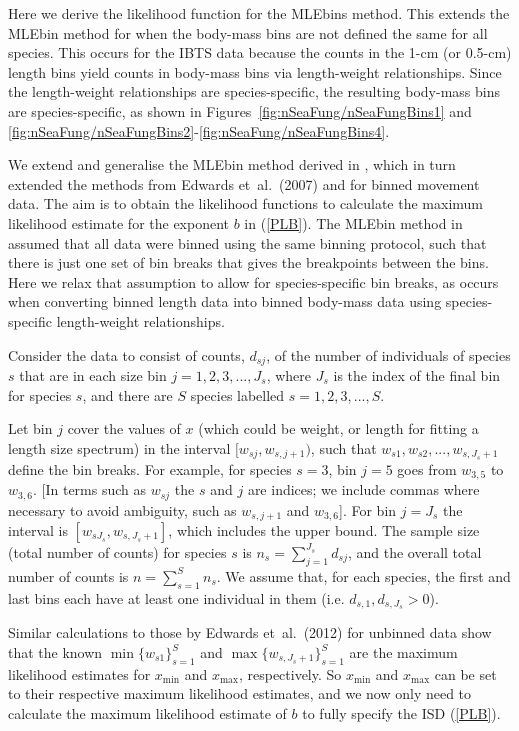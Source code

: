 \documentclass[12pt, letter]{article}
\newcommand{\xmin}{x_{\mathrm{min}}}
\newcommand{\xmax}{x_{\mathrm{max}}}
\newcommand{\MEE}{erpbb17}     %
\begin{document}
Here we derive the likelihood function for the MLEbins method. This extends the
MLEbin method for when the body-mass bins are not defined the same for all species. This
occurs for the IBTS data because the counts in the
1-cm (or 0.5-cm) length bins yield counts in body-mass bins via length-weight
relationships. Since the length-weight relationships are species-specific,
the resulting body-mass bins are species-specific, as shown in
Figures~\ref{fig:nSeaFung/nSeaFungBins1} and
\ref{fig:nSeaFung/nSeaFungBins2}-\ref{fig:nSeaFung/nSeaFungBins4}.

We extend and generalise the MLEbin method derived in \citet{\MEE}, which in
turn extended the methods from Edwards et~al.~(2007)
and \citet{edwa11} for binned
movement data. The aim is to obtain the likelihood functions to calculate the
maximum likelihood estimate for the exponent $b$ in (\ref{PLB}). The MLEbin
method in \citet{\MEE} assumed that all data were binned using the same binning
protocol, such that there is just one set of bin breaks that gives the
breakpoints between the bins. Here we relax that assumption to allow for
species-specific bin breaks, as occurs when converting binned length data into
binned body-mass data using species-specific length-weight relationships.

Consider the data to consist of counts, $d_{sj}$, of the number of individuals
of species $s$ that are in each size bin ${j = 1,2,3,...,J_s}$, where $J_s$ is
the index of the final bin for species $s$, and there are $S$ species labelled
$s=1, 2, 3, ..., S$.

Let bin $j$ cover the values of $x$ (which could be weight, or length for
fitting a length size spectrum) in the
interval $[w_{sj}, w_{s, j+1})$, such that $w_{s1}, w_{s2}, ..., w_{s, J_s +1}$
  define the bin breaks. For example, for species $s=3$, bin $j=5$ goes from
  $w_{3,5}$ to $w_{3,6}$. [In terms such as $w_{sj}$ the $s$ and $j$ are
    indices; we include commas where necessary to avoid ambiguity, such as
    $w_{s, j+1}$ and $w_{3,6}$]. For bin $j=J_s$ the interval is $[w_{s J_s},
    w_{s, J_s +1}]$, which includes the upper bound. The sample size (total
  number of counts) for species $s$ is $n_s = \sum_{j=1}^{J_s} d_{sj}$, and the
  overall total number of counts is $n = \sum_{s=1}^{S} n_s$. We assume that,
  for each species, the first and last bins each have at least one individual in
  them (i.e. $d_{s,1}, d_{s, J_s} > 0$).

Similar calculations to those by Edwards et~al.~(2012)
for unbinned data show that the
known $\min \{w_{s1}\}_{s=1}^S$ and $\max \{w_{s, J_s +1}\}_{s=1}^S$ are the
maximum likelihood estimates for $\xmin$ and $\xmax$, respectively. So $\xmin$
and $\xmax$ can be set to their respective maximum likelihood estimates, and we
now only need to calculate the maximum likelihood estimate of $b$ to fully
specify the ISD (\ref{PLB}).
\end{document}
